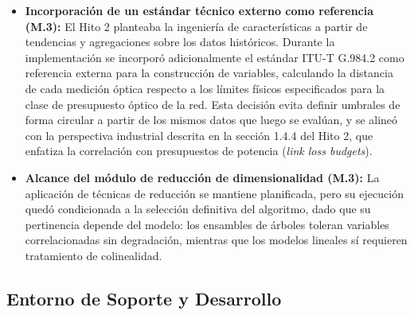\documentclass[12pt,a4paper]{article}
\begin{document}
\begin{itemize}
\item \textbf{Incorporación de un estándar técnico externo como referencia (M.3):} El Hito 2 planteaba la ingeniería de características a partir de tendencias y agregaciones sobre los datos históricos. Durante la implementación se incorporó adicionalmente el estándar ITU-T G.984.2 como referencia externa para la construcción de variables, calculando la distancia de cada medición óptica respecto a los límites físicos especificados para la clase de presupuesto óptico de la red. Esta decisión evita definir umbrales de forma circular a partir de los mismos datos que luego se evalúan, y se alineó con la perspectiva industrial descrita en la sección 1.4.4 del Hito 2, que enfatiza la correlación con presupuestos de potencia (\textit{link loss budgets}).
 
\item \textbf{Alcance del módulo de reducción de dimensionalidad (M.3):} La aplicación de técnicas de reducción se mantiene planificada, pero su ejecución quedó condicionada a la selección definitiva del algoritmo, dado que su pertinencia depende del modelo: los ensambles de árboles toleran variables correlacionadas sin degradación, mientras que los modelos lineales sí requieren tratamiento de colinealidad.
 
\end{itemize}

\subsection{Entorno de Soporte y Desarrollo}
 
\end{document}
